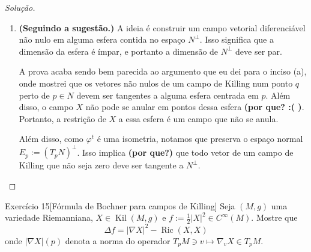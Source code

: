 \begin{proof}[Solução]
\begin{enumerate}[label=(\alph*)]
\item \textbf{(Seguindo a sugestão.)} A ideia é construir um campo vetorial diferenciável não nulo em alguma esfera contida no espaço \(N^\perp\). Isso significa que a dimensão da esfera é ímpar, e portanto a dimensão de \(N^\perp\) deve ser par.

	A prova acaba sendo bem parecida ao argumento que eu dei para o inciso (a), onde mostrei que os vetores não nulos de um campo de Killing num ponto \(q\) perto de \(p \in N\) devem ser tangentes a alguma esfera centrada em \(p\). Além disso, o campo  \(X\) não pode se anular em pontos dessa esfera \textbf{(por que? :( )}. Portanto, a restrição de \(X\) a essa esfera é um campo que não se anula.

	Além disso, como \(\varphi^t\) é uma isometria, notamos que preserva o espaço normal \(E_p:= (T_pN)^\perp\). Isso implica \textbf{(por que?)} que todo vetor de um campo de Killing que não seja zero deve ser tangente a \(N^\perp\).
\end{enumerate}
\end{proof}

\begin{thing4}{Exercício 15}[Fórmula de Bochner para campos de Killing]\label{exer:15}\leavevmode
	Seja \((M,g)\) uma variedade Riemanniana, \(X \in \operatorname{Kil}(M,g)\) e \(f:=\frac{1}{2}|X|^2\in C^\infty(M)\). Mostre que
	\[\Delta f= |\nabla X|^2-\operatorname{Ric}(X,X)\]
onde \(|\nabla X|(p)\) denota a norma do operador \(T_pM \ni v \mapsto \nabla_vX \in T_p M\).	
\end{thing4}

